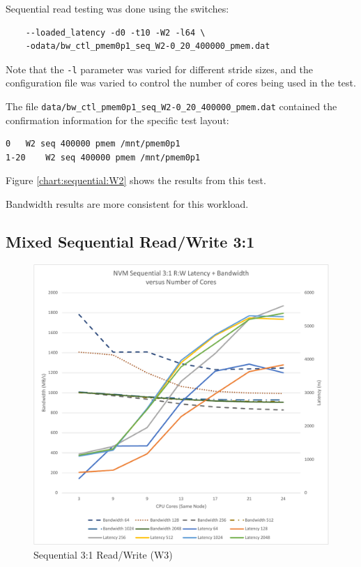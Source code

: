 Sequential read testing was done using the switches:

\begin{verbatim}
    --loaded_latency -d0 -t10 -W2 -l64 \
    -odata/bw_ctl_pmem0p1_seq_W2-0_20_400000_pmem.dat
\end{verbatim}

Note that the \verb+-l+ parameter was varied for different
stride sizes, and the configuration file was varied to control
the number of cores being used in the test.

The file \verb+data/bw_ctl_pmem0p1_seq_W2-0_20_400000_pmem.dat+ contained the confirmation information
for the specific test layout:

\begin{verbatim}
0	W2 seq 400000 pmem /mnt/pmem0p1
1-20	W2 seq 400000 pmem /mnt/pmem0p1
\end{verbatim}

Figure \ref{chart:sequential:W2} shows the results from this test.

Bandwidth results are more consistent for this workload.

\subsection{Mixed Sequential Read/Write 3:1}

\begin{figure}
    {\centering
    \caption{Sequential 3:1 Read/Write (W3)}\label{chart:sequential:w3}
    \includegraphics[scale=0.5]{charts/sequential-w3-crop.pdf}
    }
\end{figure}

